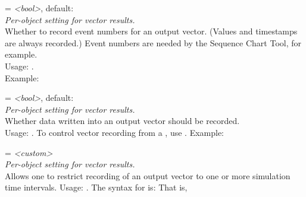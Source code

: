 \begin{description}
\item[**.vector-record-eventnumbers] = \textit{<bool>}, default: \\
    \textit{Per-object setting for vector results.}\\
    Whether to record event numbers for an output vector. (Values and
    timestamps are always recorded.) Event numbers are needed by the Sequence
    Chart Tool, for example.\\
    Usage:
    .\\
    Example:
\item[**.vector-recording] = \textit{<bool>}, default: \\
    \textit{Per-object setting for vector results.}\\
    Whether data written into an output vector should be recorded.\\
    Usage:
    .
    To control vector recording from a , use
    . Example:
\item[**.vector-recording-intervals] = \textit{<custom>}\\
    \textit{Per-object setting for vector results.}\\
    Allows one to restrict recording of an output vector to one or more
    simulation time intervals. Usage:
    .
    The syntax for  is:
     That is,

\end{description}
